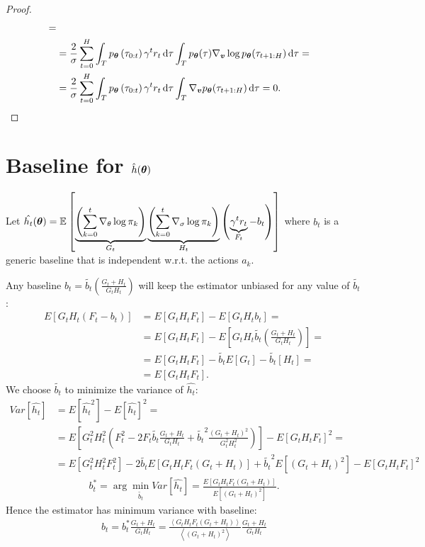 \begin{proof}
\begin{align*}
= \\ &=
\frac{2}{\sigma}\sum_{t=0}^{H}\int_{T}p_{{\boldsymbol{\theta}}}\left(\tau_{0:t}\right)\gamma^{t}r_{t}\, \textrm{d}\tau\int_{T}p_{{\boldsymbol{\theta}}}(\tau)\nabla_{\boldsymbol{v}}\log p_{{\boldsymbol{\theta}}}(\tau_{t+1:H}) \, \textrm{d}\tau
= \\ &=
\frac{2}{\sigma}\sum_{t=0}^{H}\int_{T}p_{{\boldsymbol{\theta}}}\left(\tau_{0:t}\right)\gamma^{t}r_{t}\, \textrm{d}\tau\int_{T}\nabla_{\boldsymbol{v}} p_{{\boldsymbol{\theta}}}(\tau_{t+1:H}) \, \textrm{d}\tau
= 0.
\end{align*}
\allowdisplaybreaks[0]
\end{proof}

\section{Baseline for $\hat{h}({\boldsymbol{\theta}})$}

Let $\hat{h_{t}}({\boldsymbol{\theta}}) = {\mathbb{E}_{}\left[  \underbrace{\left(\sum_{k=0}^{t} \nabla_{\theta}\log\pi_{k} \right)}_{G_t} \underbrace{ \left(\sum_{k=0}^{t} \nabla_{\sigma}\log\pi_{k} \right) }_{H_t} \left( \underbrace{\gamma^{t}r_{t}}_{F_t} - b_t\right)  \right]}$ where $b_t$ is a generic baseline that is independent w.r.t. the actions $a_k$.

Any baseline $b_t = \tilde{b_t}\left(\frac{G_{t} + H_{t}}{G_{t}H_{t}}\right)$ will keep the estimator unbiased for any value of $\tilde{b_t}$:
\allowdisplaybreaks
\begin{align*}
E\left[ G_{t}H_{t}\left(F_t - b_t\right) \right] 
&= 
E\left[ G_{t}H_{t}F_t\right] - E\left[G_{t}H_{t}b_t \right]
= \\ &=
E\left[ G_{t}H_{t}F_t\right] - E\left[G_{t}H_{t}\tilde{b_t}\left(\frac{G_{t} + H_{t}}{G_{t}H_{t}}\right) \right]
= \\ &=
E\left[ G_{t}H_{t}F_t\right] - \tilde{b_t}E\left[G_{t} \right] - \tilde{b_t}\left[H_{t} \right]
= \\ &=
E\left[ G_{t}H_{t}F_t\right].
\end{align*}
\allowdisplaybreaks[0]
We choose $\tilde{b_t}$ to minimize the variance of $\hat{h_t}$:
\allowdisplaybreaks
\begin{align*}
Var[\hat{h_t}] &= E\left[\hat{h_{t}}^2\right] - E\left[\hat{h_t}\right]^2
= \\ &=
E\left[ G_t^2 H_t^2 \left(F_t^2 - 2F_{t}\tilde{b_t}\frac{G_t+H_t}{G_t H_t} + \tilde{b_t}^2\frac{(G_t + H_t)^2}{G_t^2 H_t^2}\right) \right] - E\left[G_t H_t F_t\right]^2
= \\ &=
E\left[ G_t^2 H_t^2 F_t^2 \right] - 2\tilde{b_t}E\left[ G_t H_t F_t \left(G_t + H_t\right) \right] + \tilde{b_t}^2E\left[ \left(G_t + H_t\right)^2 \right] - E\left[G_t H_t F_t\right]^2
\end{align*}
\allowdisplaybreaks[0]
\begin{align*}
b_t^* = \arg\min_{\tilde{b_t}} Var\left[\hat{h_t}\right] = \frac{E\left[G_t H_t F_t \left(G_t + H_t\right)\right]}{E\left[\left(G_t + H_t\right)^2\right]}.
\end{align*}
Hence the estimator has minimum variance with baseline:
\begin{align*}
b_t = b_t^* \frac{G_t + H_t}{G_t H_t} = \frac{\left< G_t H_t F_t \left(G_t + H_t\right) \right>}{\left< \left( G_t + H_t \right)^2 \right>}\frac{G_t + H_t}{G_t H_t}
\end{align*}

